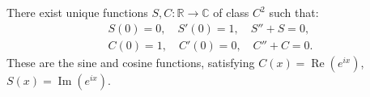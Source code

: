 There exist unique functions $S, C: \mathbb{R} \to \mathbb{C}$ of class $C^2$ such that:
\begin{align}
S(0) = 0, \quad S'(0) = 1, \quad S'' + S = 0, \\
C(0) = 1, \quad C'(0) = 0, \quad C'' + C = 0.
\end{align}
These are the sine and cosine functions, satisfying $C(x) = \operatorname{Re}(e^{ix})$, $S(x) = \operatorname{Im}(e^{ix})$.
